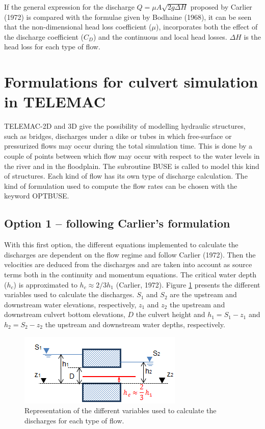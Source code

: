 If the general expression for the discharge $Q=\mu A \sqrt{2g\Delta H}$ proposed by 
Carlier (1972) is compared with the formulae given by Bodhaine (1968), 
it can be seen that the non-dimensional head loss coefficient ($\mu$), 
incorporates both the effect of the discharge coefficient ($C_D$) and the continuous 
and local head losses. $\Delta H$ is the head loss for each type of flow.

\section{Formulations for culvert simulation in TELEMAC}

TELEMAC-2D and 3D give the possibility of modelling hydraulic structures, such as bridges, 
discharges under a dike or tubes in which free-surface or pressurized flows may 
occur during the total simulation time. 
This is done by a couple of points between which flow may occur with respect to 
the water levels in the river and in the floodplain.
The subroutine BUSE is called to model this kind of structures.
Each kind of flow has its own type of discharge calculation.
The kind of formulation used to compute the flow rates can be chosen with the keyword OPTBUSE.

\subsection{Option 1 -- following Carlier's formulation}

With this first option, the different equations implemented to calculate the
discharges are dependent on the flow regime and follow Carlier (1972). 
Then the velocities are deduced from the discharges and are taken into account as source 
terms both in the continuity and momentum equations. 
The critical water depth ($h_c$) is approximated to $h_c \approx 2/3 h_1$ (Carlier, 1972). 
Figure \ref{fig:culvert_fig5} presents the different variables used to calculate the discharges. 
$S_1$ and $S_2$ are the upstream and downstream water elevations, respectively, $z_1$ and $z_2$ 
the upstream and downstream culvert bottom elevations, $D$ the culvert height and $h_1=S_1-z_1$ 
and $h_2=S_2-z_2$ the upstream and downstream water depths, respectively.

\begin{figure}[H]
\begin{center}
  \includegraphics[scale=1]{culvert_fig5.png}
\end{center}
\caption{Representation of the different variables used to calculate 
the discharges for each type of flow.}
\label{fig:culvert_fig5}
\end{figure}

